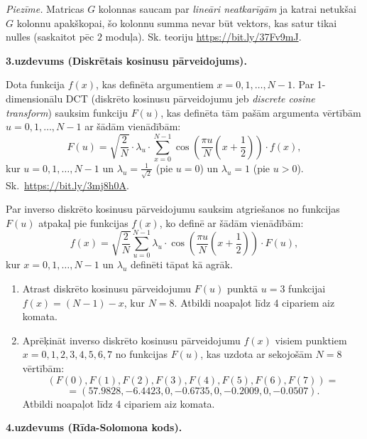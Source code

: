 \documentclass[a4paper,12pt]{article}
\begin{document}
{\em Piezīme.} Matricas $G$ kolonnas saucam par {\em lineāri neatkarīgām} 
ja katrai netukšai $G$ kolonnu apakš\-ko\-pai, šo kolonnu summa nevar būt vektors, 
kas satur tikai nulles (saskaitot pēc $2$ moduļa).
Sk. teoriju \url{https://bit.ly/37Fv9mJ}.


\vspace{20pt}
{\bf 3.uzdevums (Diskrētais kosinusu pārveidojums).}

Dota funkcija $f(x)$, kas definēta argumentiem $x=0,1,\ldots,N-1$.
Par 1-dimensionālu DCT (diskrēto kosinusu pārveidojumu jeb {\em discrete cosine transform}) sauksim
funkciju $F(u)$, kas definēta tām pašām argumenta vērtībām $u=0,1,\ldots,N-1$
ar šādām vienādībām:
$$F(u) = \sqrt{\frac{2}{N}} \cdot \lambda_u \cdot \sum\limits_{x=0}^{N-1} \cos \left( \frac{\pi u}{N}\left(  x+\frac{1}{2} \right) \right) \cdot f(x),$$
kur $u=0,1,\ldots,N-1$ un $\lambda_u = \frac{1}{\sqrt{2}}$ (pie $u=0$) un $\lambda_u = 1$ (pie $u>0$).\\
Sk.\ \url{https://bit.ly/3mj8h0A}.

Par inverso diskrēto kosinusu pārveidojumu sauksim atgriešanos no funkcijas $F(u)$ atpakaļ pie funk\-ci\-jas $f(x)$,
ko definē ar šādām vienādībām:
$$f(x) = \sqrt{\frac{2}{N}} \sum\limits_{u=0}^{N-1} \lambda_u \cdot \cos \left( \frac{\pi u}{N}\left(  x+\frac{1}{2} \right) \right) \cdot F(u),$$
kur $x=0,1,\ldots,N-1$ un $\lambda_u$ definēti tāpat kā agrāk.

\begin{enumerate}[label=(\alph*)]
\item
Atrast diskrēto kosinusu pārveidojumu $F(u)$ punktā $u=3$
funkcijai\\ $f(x) = (N-1)-x$, kur $N=8$.
Atbildi noapaļot līdz 4 cipariem aiz komata.
\item
Aprēķināt inverso diskrēto kosinusu pārveidojumu $f(x)$ visiem
punktiem\\ $x=0,1,2,3,4,5,6,7$ no funkcijas $F(u)$, kas uzdota ar
sekojošām $N=8$ vērtībām:
{\footnotesize
$$(F(0),F(1),F(2),F(3),F(4),F(5),F(6),F(7)) =$$
$$ = (57.9828,-6.4423,0,-0.6735,0,-0.2009,0,-0.0507).$$
}
Atbildi noapaļot līdz 4 cipariem aiz komata.
\end{enumerate}






\vspace{20pt}
{\bf 4.uzdevums (Rīda-Solomona kods).}
\end{document}

